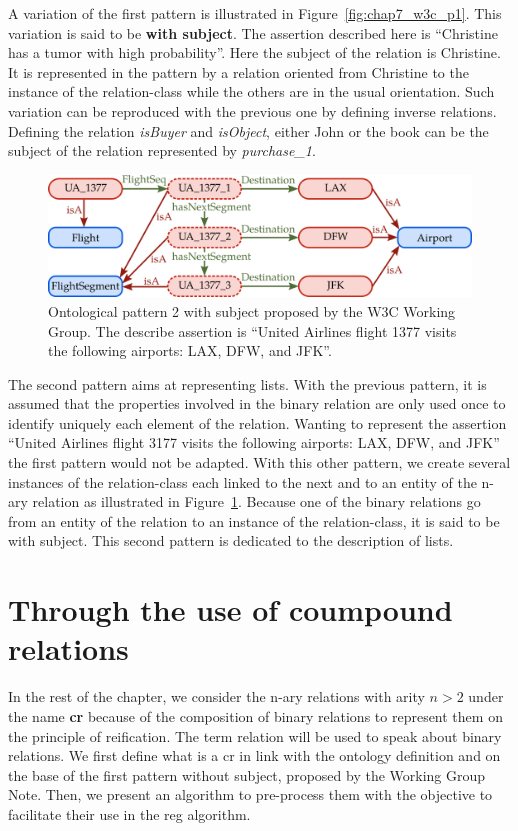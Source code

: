 A variation of the first pattern is illustrated in Figure~\ref{fig:chap7_w3c_p1}. This variation is said to be \textbf{with subject}. The assertion described here is ``Christine has a tumor with high probability''. Here the subject of the relation is Christine. It is represented in the pattern by a relation oriented from Christine to the instance of the relation-class while the others are in the usual orientation. Such variation can be reproduced with the previous one by defining inverse relations. Defining the relation \textit{isBuyer} and \textit{isObject}, either John or the book can be the subject of the relation represented by \textit{purchase\_1}.

\begin{figure}[ht!]
\centering
\includegraphics[scale=0.4]{figures/chapter7/w3c_p3.png}
\caption{\label{fig:chap7_w3c_p3} Ontological pattern 2 with subject proposed by the W3C Working Group. The describe assertion is ``United Airlines flight 1377 visits the following airports: LAX, DFW, and JFK''.}
\end{figure}


The second pattern aims at representing lists. With the previous pattern, it is assumed that the properties involved in the binary relation are only used once to identify uniquely each element of the relation. Wanting to represent the assertion ``United Airlines flight 3177 visits the following airports: LAX, DFW, and JFK'' the first pattern would not be adapted. With this other pattern, we create several instances of the relation-class each linked to the next and to an entity of the n-ary relation as illustrated in Figure~\ref{fig:chap7_w3c_p3}. Because one of the binary relations go from an entity of the relation to an instance of the relation-class, it is said to be with subject. This second pattern is dedicated to the description of lists.

\section{Through the use of coumpound relations}

In the rest of the chapter, we consider the n-ary relations with arity $n > 2$ under the name \textbf{\acrfull{cr}} because of the composition of binary relations to represent them on the principle of reification. The term relation will be used to speak about binary relations. We first define what is a \acrshort{cr} in link with the ontology definition and on the base of the first pattern without subject, proposed by the Working Group Note. Then, we present an algorithm to pre-process them with the objective to facilitate their use in the \acrshort{reg} algorithm.

